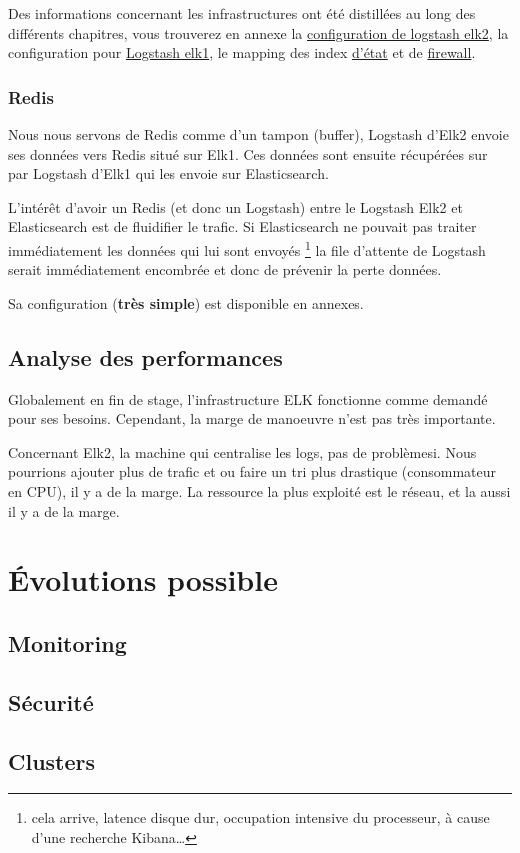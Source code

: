 Des informations concernant les infrastructures ont été distillées au long des différents
chapitres, vous trouverez en annexe la \hyperref[]{configuration de logstash elk2},
la configuration pour \hyperref[]{Logstash elk1}, le mapping des index \hyperref[]{d'état} et 
de \hyperref[]{firewall}. 

\subsubsection{Redis}
Nous nous servons de Redis comme d'un tampon (buffer), Logstash d'Elk2 envoie ses 
données vers Redis situé sur Elk1. Ces données sont ensuite récupérées sur par Logstash
d'Elk1 qui les envoie sur Elasticsearch.

L'intérêt d'avoir un Redis (et donc un Logstash) entre le Logstash Elk2 et Elasticsearch
est de fluidifier le trafic. Si Elasticsearch ne pouvait pas traiter immédiatement 
les données qui lui sont envoyés \footnote{cela arrive, latence disque dur, occupation
intensive du processeur, à cause d'une recherche Kibana\ldots} la file d'attente 
de Logstash serait immédiatement encombrée et donc de prévenir la perte données.

Sa configuration (\textbf{très simple}) est disponible en annexes.

\subsection{Analyse des performances}
Globalement en fin de stage, l'infrastructure ELK fonctionne comme demandé pour ses besoins.
Cependant, la marge de manoeuvre n'est pas très importante.

Concernant Elk2, la machine qui centralise les logs, pas de problèmesi. Nous pourrions
ajouter plus de trafic et ou faire un tri plus drastique (consommateur en CPU), il
y a de la marge. La ressource la plus exploité est le réseau, et la aussi il y a 
de la marge.





\section{Évolutions possible}
\subsection{Monitoring}
\subsection{Sécurité}
\subsection{Clusters}
